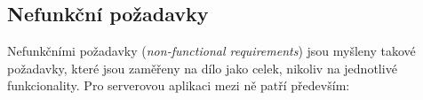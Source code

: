 

\subsection{Nefunkční požadavky}
Nefunkčními požadavky (\textit{non-functional requirements}) jsou myšleny takové požadavky, které jsou zaměřeny na dílo jako celek, nikoliv na jednotlivé funkcionality. Pro serverovou aplikaci mezi ně patří především:

